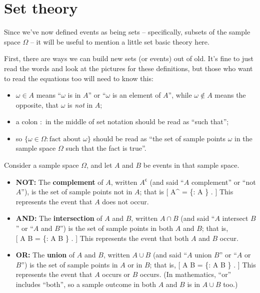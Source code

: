 \documentclass[
  letterpaper,
  DIV=11,
  numbers=noendperiod]{scrreprt}
\providecommand{\tightlist}{%
  \setlength{\itemsep}{0pt}\setlength{\parskip}{0pt}}\usepackage{longtable,booktabs,array}
\theoremstyle{remark}
\begin{document}
\hypertarget{set-theory}{%
\section{Set theory}\label{set-theory}}

Since we've now defined events as being sets -- specifically, subsets of
the sample space \(\Omega\) -- it will be useful to mention a little set
basic theory here.

First, there are ways we can build new sets (or events) out of old. It's
fine to just read the words and look at the pictures for these
definitions, but those who want to read the equations too will need to
know this:

\begin{itemize}
\tightlist
\item
  \(\omega \in A\) means ``\(\omega\) is in \(A\)'' or ``\(\omega\) is
  an element of \(A\)'', while \(\omega \not\in A\) means the opposite,
  that \(\omega\) is \emph{not} in \(A\);
\item
  a colon \(:\) in the middle of set notation should be read as ``such
  that'';
\item
  so \(\{\omega \in \Omega : \text{fact about $\omega$}\}\) should be
  read as ``the set of sample points \(\omega\) in the sample space
  \(\Omega\) such that the fact is true''.
\end{itemize}

Consider a sample space \(\Omega\), and let \(A\) and \(B\) be events in
that sample space.

\begin{itemize}
\tightlist
\item
  \textbf{{NOT:}} The \textbf{complement} of \(A\), written
  \(A^\mathsf{c}\) (and said ``\(A\) complement'' or ``not \(A\)''), is
  the set of sample points not in \(A\); that is {[} A\^{} =
  \{\omega \in \Omega : \omega \not\in A \} . {]} This represents the
  event that \(A\) does not occur.
\item
  \textbf{{AND}:} The \textbf{intersection} of \(A\) and \(B\), written
  \(A \cap B\) (and said ``\(A\) intersect \(B\)'' or ``\(A\) and
  \(B\)'') is the set of sample points in both \(A\) and \(B\); that
  is,\\
  {[} A \cap B = \{\omega \in \Omega : \omega \in A 
  \omega \in B \} . {]} This represents the event that both \(A\) and
  \(B\) occur.
\item
  \textbf{{OR:}} The \textbf{union} of \(A\) and \(B\), written
  \(A \cup B\) (and said ``\(A\) union \(B\)'' or ``\(A\) or \(B\)'') is
  the set of sample points in \(A\) or in \(B\); that is, {[} A \cup B =
  \{\omega \in \Omega : \omega \in A  \omega \in B \} . {]}
  This represents the event that \(A\) occurs or \(B\) occurs. (In
  mathematics, ``or'' includes ``both'', so a sample outcome in both
  \(A\) and \(B\) is in \(A\cup B\) too.)
\end{itemize}
\end{document}
